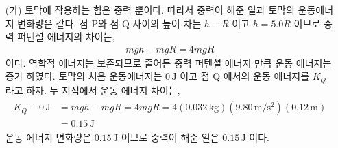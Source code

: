 \documentclass[floatfix,nofootinbib,superscriptaddress,fleqn]{revtex4-2}
\begin{document}
\begin{itemize}
  \item[(가)] 토막에 작용하는 힘은 중력 뿐이다. 따라서 중력이 해준 일과 
  토막의 운동에너지 변화량은 같다. 
  점 P와 점 Q 사이의 높이 차는 $h-R$ 이고 $h=5.0R$ 이므로
   중력 퍼텐셜 에너지의 차이는,
  \begin{align}
    mgh - mgR = 4mgR
  \end{align}
  이다. 역학적 에너지는 보존되므로 줄어든 중력 퍼텐셜 에너지 만큼 
  운동 에너지는 증가 하였다. 토막의 처음 운동에너지는 
  $0\,\mathrm{J}$ 이고 점 Q 에서의 운동 에너지를 $K_Q$ 라고 하자. 
  두 지점에서 운동 에너지 차이는,
  \begin{align}\label{eq:3-1}
    \begin{split}
      K_Q - 0\,\mathrm{J} &= mgh - mgR = 4mgR 
      =4(0.032\,\mathrm{kg})(9.80\,\mathrm{m/s^2})(0.12\,\mathrm{m})  \\
      &= 0.15\,\mathrm{J}
    \end{split}
  \end{align}
  운동 에너지 변화량은 $0.15\,\mathrm{J}$ 이므로 
  중력이 해준 일은 $0.15\,\mathrm{J}$ 이다.
  

\end{itemize}
\end{document}
